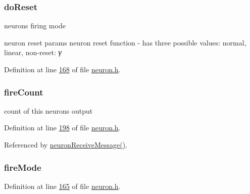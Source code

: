 \hypertarget{structneuron_state_afcf9d931e4fda519c43b4efeab687463}{}
\subsubsection[{do\+Reset}]{ do\+Reset}\label{structneuron_state_afcf9d931e4fda519c43b4efeab687463}


neuron\textquotesingle{}s firing mode 

neuron reset params neuron reset function -\/ has three possible values\+: normal, linear, non-\/reset\+: 𝛾 

Definition at line \hyperlink{neuron_8h_source_l00168}{168} of file \hyperlink{neuron_8h_source}{neuron.\+h}.

\hypertarget{structneuron_state_afe8825076c4cf3863c677307fec63c61}{}
\subsubsection[{fire\+Count}]{ fire\+Count}\label{structneuron_state_afe8825076c4cf3863c677307fec63c61}


count of this neuron\textquotesingle{}s output 



Definition at line \hyperlink{neuron_8h_source_l00198}{198} of file \hyperlink{neuron_8h_source}{neuron.\+h}.



Referenced by \hyperlink{neuron_8c_source_l00104}{neuron\+Receive\+Message()}.

\hypertarget{structneuron_state_a55890f9e021064df30e9d18a9df98845}{}
\subsubsection[{fire\+Mode}]{ fire\+Mode}\label{structneuron_state_a55890f9e021064df30e9d18a9df98845}


Definition at line \hyperlink{neuron_8h_source_l00165}{165} of file \hyperlink{neuron_8h_source}{neuron.\+h}.

